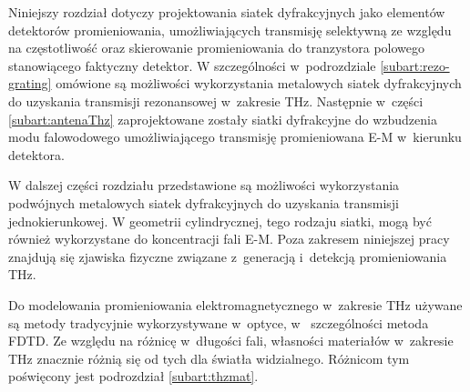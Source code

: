 Niniejszy rozdział dotyczy projektowania siatek dyfrakcyjnych jako elementów detektorów promieniowania, umożliwiających transmisję selektywną ze względu na częstotliwość oraz skierowanie promieniowania do tranzystora polowego stanowiącego faktyczny detektor. W szczególności w~podrozdziale \ref{subart:rezo-grating} omówione są możliwości wykorzystania metalowych siatek dyfrakcyjnych do uzyskania transmisji rezonansowej w~zakresie THz. Następnie w~części \ref{subart:antenaThz} zaprojektowane zostały siatki dyfrakcyjne do wzbudzenia modu falowodowego umożliwiającego transmisję promieniowana E-M w~kierunku detektora.

W dalszej części rozdziału przedstawione są możliwości wykorzystania podwójnych metalowych siatek dyfrakcyjnych do uzyskania transmisji jednokierunkowej. W geometrii cylindrycznej, tego rodzaju siatki, mogą być również wykorzystane do koncentracji fali E-M. Poza zakresem niniejszej pracy znajdują się zjawiska fizyczne związane z~generacją i~detekcją promieniowania THz.

Do modelowania promieniowania elektromagnetycznego w~zakresie THz używane są metody tradycyjnie wykorzystywane w~optyce, w~ szczególności metoda FDTD. Ze względu na różnicę w~długości fali, własności materiałów w~zakresie THz znacznie różnią się od tych dla światła widzialnego. Różnicom tym poświęcony jest podrozdział \ref{subart:thzmat}.
